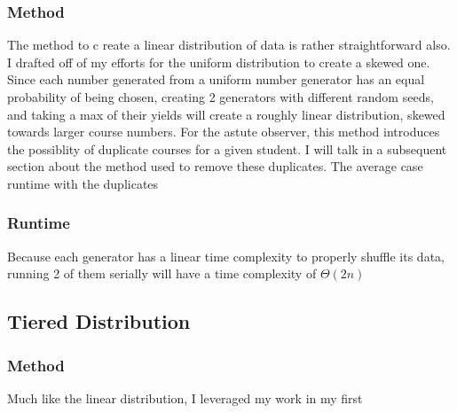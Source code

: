\documentclass[11pt]{article}
\begin{document}
        \subsubsection{Method}
            The method to c reate a linear distribution of data is rather straightforward also. I drafted off of my efforts for the uniform distribution to create a skewed one. Since each number generated from a uniform number generator has an equal probability of being chosen, creating 2 generators with different random seeds, and taking a max of their yields will create a roughly linear distribution, skewed towards larger course numbers. For the astute observer, this method introduces the possiblity of duplicate courses for a given student. I will talk in a subsequent section about the method used to remove these duplicates. The average case runtime with the duplicates 
        \subsubsection{Runtime}
             Because each generator has a linear time complexity to properly shuffle its data, running 2 of them serially will have a time complexity of $\Theta(2n)$
    \subsection{Tiered Distribution}
        \subsubsection{Method}
             Much like the linear distribution, I leveraged my work in my first
\end{document}
